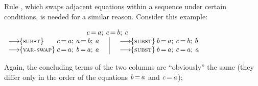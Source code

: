 \documentclass[acmsmall]{acmart}
\newcommand{\Varid}[1]{\mathit{#1}}
\newcommand{\ie}{\emph{i.e.}\xspace}	%
\begin{document}
Rule , which swaps adjacent equations within a sequence under certain conditions, is needed for a similar reason. Consider
this example:
\begin{center}                         %
$
\begin{array}{l@{\,}l@{\hspace{0.5cm}}|@{\hspace{0.5cm}}l@{\,}l}
  \multicolumn{4}{c}{\quad\ensuremath{\Varid{c}\hspace{-0.14em}=\hspace{-0.14em}\Varid{a};\,\Varid{c}\hspace{-0.14em}=\hspace{-0.14em}\Varid{b};\,\Varid{c}}} \\
  \movestoR{subst} & \ensuremath{\Varid{c}\hspace{-0.14em}=\hspace{-0.14em}\Varid{a};\,\Varid{a}\hspace{-0.14em}=\hspace{-0.14em}\Varid{b};\,\Varid{a}} &
     \movestoR{subst} & \ensuremath{\Varid{b}\hspace{-0.14em}=\hspace{-0.14em}\Varid{a};\,\Varid{c}\hspace{-0.14em}=\hspace{-0.14em}\Varid{b};\,\Varid{b}} \\
  \movestoR{var-swap} & \ensuremath{\Varid{c}\hspace{-0.14em}=\hspace{-0.14em}\Varid{a};\,\Varid{b}\hspace{-0.14em}=\hspace{-0.14em}\Varid{a};\,\Varid{a}} &
     \movestoR{subst}   & \ensuremath{\Varid{b}\hspace{-0.14em}=\hspace{-0.14em}\Varid{a};\,\Varid{c}\hspace{-0.14em}=\hspace{-0.14em}\Varid{a};\,\Varid{a}} \\
\end{array}
$
\end{center}
Again, the concluding terms of the two columns are ``obviously'' the same
(they differ only in the order of the equations \ensuremath{\Varid{b}\hspace{-0.14em}=\hspace{-0.14em}\Varid{a}} and \ensuremath{\Varid{c}\hspace{-0.14em}=\hspace{-0.14em}\Varid{a}});
\end{document}
